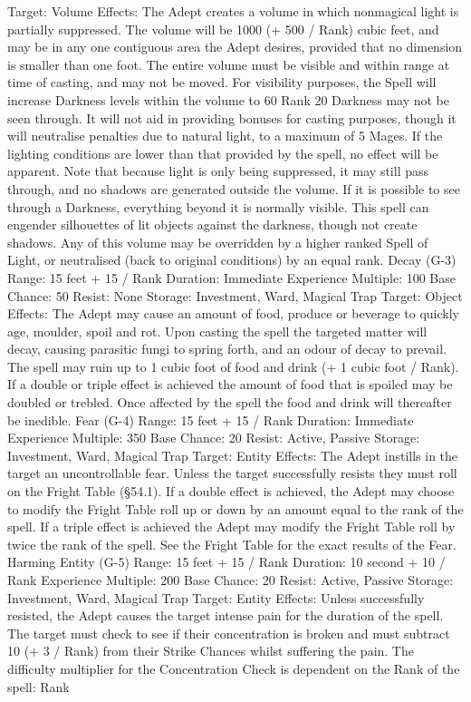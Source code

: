\documentclass[a4paper]{article}
\begin{document}
\begin{multicols}{3}
Target: Volume
Effects: The Adept creates a volume in which nonmagical light is partially suppressed. The volume
will be 1000 (+ 500 / Rank) cubic feet, and may be
in any one contiguous area the Adept desires, provided that no dimension is smaller than one foot.
The entire volume must be visible and within range
at time of casting, and may not be moved. For
visibility purposes, the Spell will increase Darkness levels within the volume to 60%
Rank 20 Darkness may not be seen through. It will
not aid in providing bonuses for casting purposes,
though it will neutralise penalties due to natural
light, to a maximum of 5%
Mages. If the lighting conditions are lower than
that provided by the spell, no effect will be apparent. Note that because light is only being suppressed, it may still pass through, and no shadows
are generated outside the volume. If it is possible to
see through a Darkness, everything beyond it is
normally visible. This spell can engender silhouettes of lit objects against the darkness, though not
create shadows. Any of this volume may be overridden by a higher ranked Spell of Light, or neutralised (back to original conditions) by an equal
rank.
Decay (G-3)
Range: 15 feet + 15 / Rank
Duration: Immediate
Experience Multiple: 100
Base Chance: 50%
Resist: None
Storage: Investment, Ward, Magical Trap
Target: Object
Effects: The Adept may cause an amount of food,
produce or beverage to quickly age, moulder, spoil
and rot. Upon casting the spell the targeted matter
will decay, causing parasitic fungi to spring forth,
and an odour of decay to prevail. The spell may
ruin up to 1 cubic foot of food and drink (+ 1 cubic
foot / Rank). If a double or triple effect is achieved
the amount of food that is spoiled may be doubled
or trebled. Once affected by the spell the food and
drink will thereafter be inedible.
Fear (G-4)
Range: 15 feet + 15 / Rank
Duration: Immediate
Experience Multiple: 350
Base Chance: 20%
Resist: Active, Passive
Storage: Investment, Ward, Magical Trap
Target: Entity
Effects: The Adept instills in the target an uncontrollable fear. Unless the target successfully resists
they must roll on the Fright Table (§54.1). If a
double effect is achieved, the Adept may choose to
modify the Fright Table roll up or down by an
amount equal to the rank of the spell. If a triple
effect is achieved the Adept may modify the Fright
Table roll by twice the rank of the spell. See the
Fright Table for the exact results of the Fear.
Harming Entity (G-5)
Range: 15 feet + 15 / Rank
Duration: 10 second + 10 / Rank
Experience Multiple: 200
Base Chance: 20%
Resist: Active, Passive
Storage: Investment, Ward, Magical Trap
Target: Entity
Effects: Unless successfully resisted, the Adept
causes the target intense pain for the duration of
the spell. The target must check to see if their
concentration is broken and must subtract 10 (+ 3 /
Rank) from their Strike Chances whilst suffering
the pain. The difficulty multiplier for the Concentration Check is dependent on the Rank of the
spell:
Rank


\end{multicols}
\end{document}
